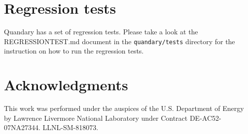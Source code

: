 \documentclass[11pt]{article}
\begin{document}
\section{Regression tests}
Quandary has a set of regression tests. Please take a look at the
REGRESSIONTEST.md document in the \verb+quandary/tests+ directory for the
instruction on how to run the regression tests. 

    \section*{Acknowledgments}
    This work was performed under the auspices of the U.S. Department of Energy by Lawrence
    Livermore National Laboratory under Contract DE-AC52-07NA27344. LLNL-SM-818073. 
\end{document}
